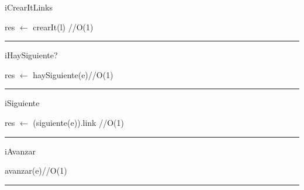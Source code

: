 \begin{algorithm}[H]
\caption{iCrearItLinks}
\begin{algorithmic}[1]
\State res $\gets$ crearIt(l) \hfill //O(1)
\EndFunction 
\end{algorithmic}
\hrule
{}
\end{algorithm}

\begin{algorithm}[H]
\caption{iHaySiguiente?}
\begin{algorithmic}[1]
\state res $\gets$ haySiguiente(e)\hfill //O(1)
\EndFunction 
\end{algorithmic}
\hrule
{}
\end{algorithm}

\begin{algorithm}[H]
\caption{iSiguiente}
\begin{algorithmic}[1]
\state res $\gets$ (siguiente(e)).link \hfill //O(1)
\EndFunction 
\end{algorithmic}
\hrule
{}
\end{algorithm}

\begin{algorithm}[H]
\caption{iAvanzar}
\begin{algorithmic}[1]
\state avanzar(e)\hfill //O(1)
\EndFunction 
\end{algorithmic}
\hrule
{}
\end{algorithm}